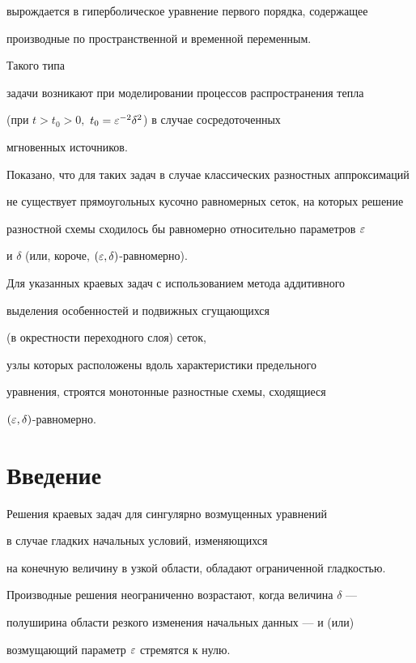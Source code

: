 вырождается в гиперболическое уравнение первого порядка, содержащее 


производные по пространственной и временной переменным. 


Такого типа


задачи возникают при моделировании процессов распространения тепла 


(при $t>t_0>0,$ $t_0=\varepsilon^{-2}\delta^2$) в случае сосредоточенных 


мгновенных источников.





Показано, что для таких задач в случае классических разностных аппроксимаций


не существует прямоугольных кусочно равномерных сеток, на которых решение


разностной схемы сходилось бы равномерно относительно параметров $\varepsilon$


и $\delta$ (или, короче, $(\varepsilon,\delta)$-равномерно). 


Для указанных краевых задач с использованием метода аддитивного


выделения особенностей и подвижных сгущающихся 


(в окрестности переходного слоя) сеток, 


узлы которых расположены вдоль характеристики предельного 


уравнения, строятся монотонные разностные схемы, сходящиеся 


$(\varepsilon,\delta)$-равномерно. 





\section*{Введение}





Решения краевых задач для сингулярно возмущенных уравнений


в случае гладких начальных условий, изменяющихся


на конечную величину в узкой области, обладают ограниченной гладкостью.


Производные решения неограниченно возрастают, когда величина $\delta$ ---


полуширина области резкого изменения начальных данных --- и (или)


возмущающий параметр $\varepsilon$ стремятся к нулю. 


